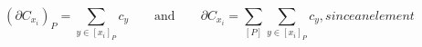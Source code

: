 $$
\begin{equation}\label{boundaryofspecialcycle}
(\partial C_{x_i})_P = \sum_{ y \in [x_i]_P} c_y \qquad  \text{and} \qquad  \partial C_{x_i}= \sum_{[P]} \sum_{ y \in [x_i]_P} c_y,
\end{equation}
since an element $$